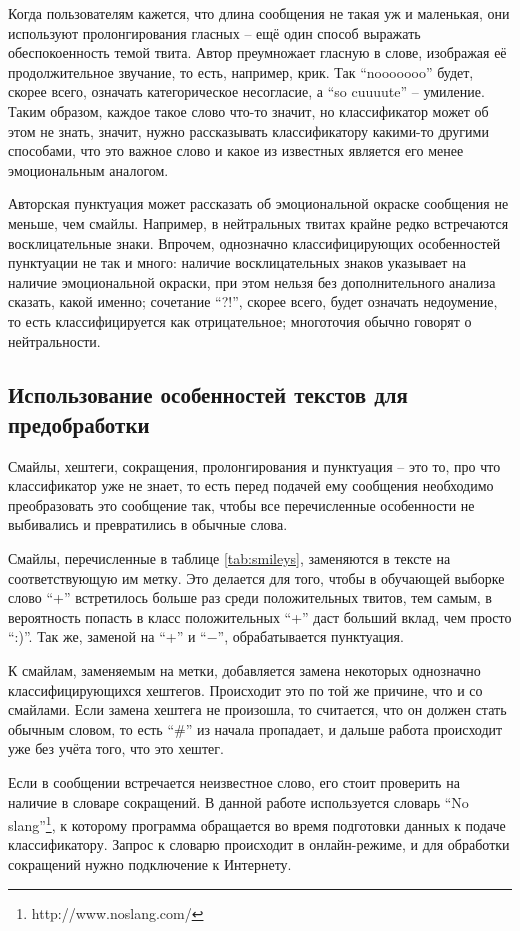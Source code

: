 Когда пользователям кажется, что длина сообщения не такая уж и маленькая, они используют
пролонгирования гласных -- ещё один способ выражать обеспокоенность темой твита. Автор преумножает
гласную в слове, изображая её продолжительное звучание, то есть, например, крик. Так ``nooooooo''
будет, скорее всего, означать категорическое несогласие, а ``so cuuuute'' -- умиление. Таким
образом, каждое такое слово что-то значит, но классификатор может об этом не знать, значит, нужно
рассказывать классификатору какими-то другими способами, что это важное слово и какое из известных
является его менее эмоциональным аналогом.

Авторская пунктуация может рассказать об эмоциональной окраске сообщения не меньше, чем
смайлы. Например, в нейтральных твитах крайне редко встречаются восклицательные знаки. Впрочем,
однозначно классифицирующих особенностей пунктуации не так и много: наличие восклицательных знаков
указывает на наличие эмоциональной окраски, при этом нельзя без дополнительного анализа сказать,
какой именно; сочетание ``?!'', скорее всего, будет означать недоумение, то есть классифицируется
как отрицательное; многоточия обычно говорят о нейтральности.

\subsection{Использование особенностей текстов для предобработки}\label{spec}
Смайлы, хештеги, сокращения, пролонгирования и пунктуация -- это то, про что классификатор уже не
знает, то есть перед подачей ему сообщения необходимо преобразовать это сообщение так, чтобы все
перечисленные особенности не выбивались и превратились в обычные слова.

Смайлы, перечисленные в таблице \ref{tab:smileys}, заменяются в тексте на соответствующую им
метку. Это делается для того, чтобы в обучающей выборке слово ``+'' встретилось больше раз среди
положительных твитов, тем самым, в вероятность попасть в класс положительных ``+'' даст больший
вклад, чем  просто ``:)''. Так же, заменой на ``+'' и ``$\minus$'', обрабатывается пунктуация.

К смайлам, заменяемым на метки, добавляется замена некоторых однозначно классифицирующихся
хештегов. Происходит это по той же причине, что и со смайлами. Если замена хештега не произошла, то
считается, что он должен стать обычным словом, то есть ``\#'' из начала пропадает, и дальше работа
происходит уже без учёта того, что это хештег.

Если в сообщении встречается неизвестное слово, его стоит проверить на наличие в словаре сокращений. В данной
работе используется словарь ``No slang''\footnote{http://www.noslang.com/}, к которому программа
обращается во время подготовки данных к подаче классификатору. Запрос к словарю происходит в
онлайн-режиме, и для обработки сокращений нужно подключение к Интернету.

